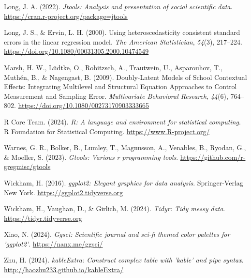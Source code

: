 \documentclass[
  letterpaper,
  DIV=11,
  numbers=noendperiod]{scrartcl}
\newlength{\cslhangindent}
\newenvironment{CSLReferences}[2] %
 {\begin{list}{}{%
  \setlength{\itemindent}{0pt}
  \setlength{\leftmargin}{0pt}
  \setlength{\parsep}{0pt}
  \ifodd #1
   \setlength{\leftmargin}{\cslhangindent}
   \setlength{\itemindent}{-1\cslhangindent}
  \fi
  \setlength{\itemsep}{#2\baselineskip}}}
 {\end{list}}
\begin{document}
\begin{CSLReferences}{1}{0}
Long, J. A. (2022). \emph{Jtools: Analysis and presentation of social
scientific data}. \url{https://cran.r-project.org/package=jtools}

Long, J. S., \& Ervin, L. H. (2000). Using heteroscedasticity consistent
standard errors in the linear regression model. \emph{The American
Statistician}, \emph{54}(3), 217--224.
\url{https://doi.org/10.1080/00031305.2000.10474549}

Marsh, H. W., Lüdtke, O., Robitzsch, A., Trautwein, U., Asparouhov, T.,
Muthén, B., \& Nagengast, B. (2009). Doubly-{Latent Models} of {School
Contextual Effects}: {Integrating Multilevel} and {Structural Equation
Approaches} to {Control Measurement} and {Sampling Error}.
\emph{Multivariate Behavioral Research}, \emph{44}(6), 764--802.
\url{https://doi.org/10.1080/00273170903333665}

R Core Team. (2024). \emph{R: A language and environment for statistical
computing}. R Foundation for Statistical Computing.
\url{https://www.R-project.org/}

Warnes, G. R., Bolker, B., Lumley, T., Magnusson, A., Venables, B.,
Ryodan, G., \& Moeller, S. (2023). \emph{Gtools: Various r programming
tools}. \url{https://github.com/r-gregmisc/gtools}

Wickham, H. (2016). \emph{ggplot2: Elegant graphics for data analysis}.
Springer-Verlag New York. \url{https://ggplot2.tidyverse.org}

Wickham, H., Vaughan, D., \& Girlich, M. (2024). \emph{Tidyr: Tidy messy
data}. \url{https://tidyr.tidyverse.org}

Xiao, N. (2024). \emph{Ggsci: Scientific journal and sci-fi themed color
palettes for 'ggplot2'}. \url{https://nanx.me/ggsci/}

Zhu, H. (2024). \emph{kableExtra: Construct complex table with 'kable'
and pipe syntax}. \url{http://haozhu233.github.io/kableExtra/}

\end{CSLReferences}
\end{document}

